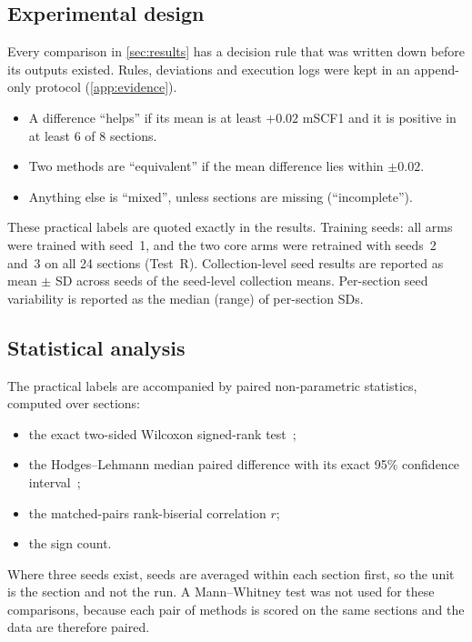 \subsection{Experimental design}
\label{sec:design}
Every comparison in \cref{sec:results} has a decision rule that was written
down before its outputs existed. Rules, deviations and execution logs were
kept in an append-only protocol (\cref{app:evidence}).
\begin{itemize}
  \item A difference ``helps'' if its mean is at least $+0.02$ mSCF1 and it is
        positive in at least 6 of 8 sections.
  \item Two methods are ``equivalent'' if the mean difference lies within
        $\pm0.02$.
  \item Anything else is ``mixed'', unless sections are missing
        (``incomplete'').
\end{itemize}
These practical labels are quoted exactly in the results.
Training seeds: all arms were trained with seed~1, and the two core arms were
retrained with seeds~2 and~3 on all 24 sections (Test~R). Collection-level
seed results are reported as mean $\pm$ SD across seeds of the seed-level
collection means. Per-section seed variability is reported as the median
(range) of per-section SDs.

\subsection{Statistical analysis}
\label{sec:stats}
The practical labels are accompanied by paired non-parametric statistics,
computed over sections:
\begin{itemize}
  \item the exact two-sided Wilcoxon signed-rank test~\citep{wilcoxon1945individual};
  \item the Hodges--Lehmann median paired difference with its exact 95\%
        confidence interval~\citep{hodges1963estimates};
  \item the matched-pairs rank-biserial correlation $r$;
  \item the sign count.
\end{itemize}
Where three seeds exist, seeds are averaged within each section first, so the
unit is the section and not the run. A Mann--Whitney test was not used for
these comparisons, because each pair of methods is scored on the same sections
and the data are therefore paired.

